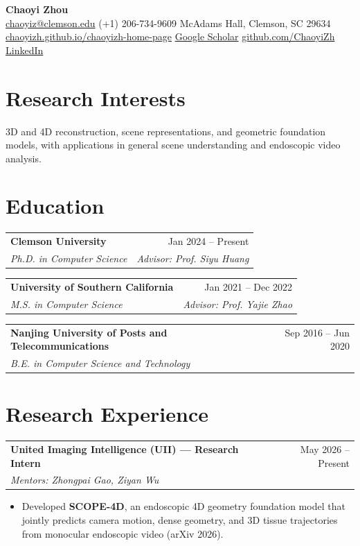 \documentclass[letterpaper,10pt]{article}
\makeatletter
\newcommand{\when}[1]{{\color{muted}#1}}
\newcommand{\resumeSubheading}[4]{%
  \par\vspace{3pt}\noindent
  \begin{tabular*}{\textwidth}[t]{@{}l@{\extracolsep{\fill}}r@{}}
    \textbf{#1} & \when{#2} \\
    \textit{#3} & \textit{\color{muted}#4} \\
  \end{tabular*}\par}
\newcommand{\resumeItem}[1]{\item #1}
\newcommand{\resumeItemListStart}{\begin{itemize}}
\newcommand{\resumeItemListEnd}{\end{itemize}}
\makeatother
\begin{document}
\begin{center}
    {\Huge\bfseries Chaoyi Zhou} \\[6pt]
    \small
    \href{mailto:chaoyiz@clemson.edu}{chaoyiz@clemson.edu}
    \;{\color{muted}$\cdot$}\; (+1) 206-734-9609
    \;{\color{muted}$\cdot$} McAdams Hall, Clemson, SC 29634 \\[2pt]
    \href{https://chaoyizh.github.io/chaoyizh-home-page/}{chaoyizh.github.io/chaoyizh-home-page}
    \;{\color{muted}$\cdot$}\; \href{https://scholar.google.com/citations?user=oEfDTB4AAAAJ}{Google Scholar}
    \;{\color{muted}$\cdot$}\; \href{https://github.com/ChaoyiZh}{github.com/ChaoyiZh}
    \;{\color{muted}$\cdot$}\; \href{https://www.linkedin.com/in/chaoyi-zhou-313a3222a/}{LinkedIn}
\end{center}
\vspace{-4pt}

\section{Research Interests}
3D and 4D reconstruction, scene representations, and geometric foundation models, with applications in general scene understanding and endoscopic video analysis.

\section{Education}
\resumeSubheading
{Clemson University}{Jan 2024 -- Present}
{Ph.D. in Computer Science}{Advisor: Prof. Siyu Huang}

\resumeSubheading
{University of Southern California}{Jan 2021 -- Dec 2022}
{M.S. in Computer Science}{Advisor: Prof. Yajie Zhao}

\resumeSubheading
{Nanjing University of Posts and Telecommunications}{Sep 2016 -- Jun 2020}
{B.E. in Computer Science and Technology}{}

\section{Research Experience}
  \resumeSubheading
    {United Imaging Intelligence (UII) --- Research Intern}{May 2026 -- Present}
    {Mentors: Zhongpai Gao, Ziyan Wu}{}
  \resumeItemListStart
    \resumeItem{Developed \textbf{SCOPE-4D}, an endoscopic 4D geometry foundation model that jointly predicts camera motion, dense geometry, and 3D tissue trajectories from monocular endoscopic video (arXiv 2026).}
  \resumeItemListEnd
\end{document}
